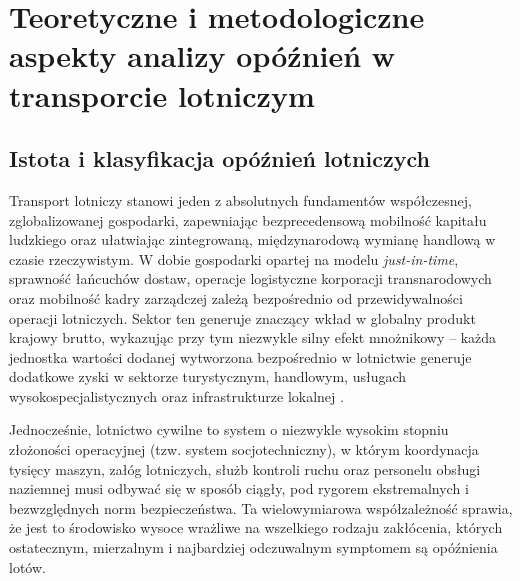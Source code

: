 \chapter{Teoretyczne i metodologiczne aspekty analizy opóźnień w transporcie lotniczym} 

\section{Istota i klasyfikacja opóźnień lotniczych}

Transport lotniczy stanowi jeden z absolutnych fundamentów współczesnej, zglobalizowanej gospodarki, zapewniając bezprecedensową mobilność kapitału ludzkiego oraz ułatwiając zintegrowaną, międzynarodową wymianę handlową w czasie rzeczywistym. W dobie gospodarki opartej na modelu \textit{just-in-time}, sprawność łańcuchów dostaw, operacje logistyczne korporacji transnarodowych oraz mobilność kadry zarządczej zależą bezpośrednio od przewidywalności operacji lotniczych. Sektor ten generuje znaczący wkład w globalny produkt krajowy brutto, wykazując przy tym niezwykle silny efekt mnożnikowy – każda jednostka wartości dodanej wytworzona bezpośrednio w lotnictwie generuje dodatkowe zyski w sektorze turystycznym, handlowym, usługach wysokospecjalistycznych oraz infrastrukturze lokalnej \cite{faa2022economic}. 

Jednocześnie, lotnictwo cywilne to system o niezwykle wysokim stopniu złożoności operacyjnej (tzw. system socjotechniczny), w którym koordynacja tysięcy maszyn, załóg lotniczych, służb kontroli ruchu oraz personelu obsługi naziemnej musi odbywać się w sposób ciągły, pod rygorem ekstremalnych i bezwzględnych norm bezpieczeństwa. Ta wielowymiarowa współzależność sprawia, że jest to środowisko wysoce wrażliwe na wszelkiego rodzaju zakłócenia, których ostatecznym, mierzalnym i najbardziej odczuwalnym symptomem są opóźnienia lotów. 

